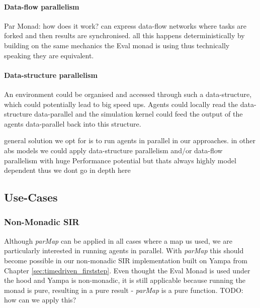 
\paragraph{Data-flow parallelism}
Par Monad: how does it work? can express data-flow networks where tasks are forked and then results are synchronised. all this happens deterministically by building on the same mechanics the Eval monad is using thus technically speaking they are equivalent. 


\paragraph{Data-structure parallelism}
An environment could be organised and accessed through such a data-structure, which could potentially lead to big speed ups. Agents could locally read the data-structure data-parallel and the simulation kernel could feed the output of the agents data-parallel back into this structure.


general solution we opt for is  to run agents in parallel in our approaches. in other abs models we could apply data-structure parallelism and/or data-flow parallelism with huge Performance potential but thats always highly model dependent thus we dont go in depth here

\subsection{Use-Cases}

\subsubsection{Non-Monadic SIR}
Although \textit{parMap} can be applied in all cases where a map us used, we are particularly interested in running agents in parallel. With \textit{parMap} this should become possible in our non-monadic SIR implementation built on Yampa from Chapter \ref{sec:timedriven_firststep}. Even thought the Eval Monad is used under the hood and Yampa is non-monadic, it is still applicable because running the monad is pure, resulting in a pure result - \textit{parMap} is a pure function. TODO: how can we apply this?


